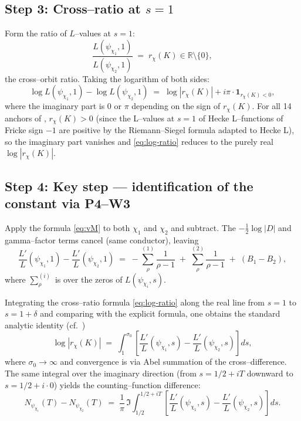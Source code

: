 \documentclass[11pt]{amsart}
\theoremstyle{definition}
\theoremstyle{remark}
\newcommand{\R}{\mathbb{R}}
\begin{document}
\subsection*{Step 3: Cross--ratio at \(s = 1\)}
Form the ratio of \(L\)--values at \(s = 1\):
\begin{equation}\label{eq:ratio-eq}
  \frac{L(\psi_{\chi_1}, 1)}{L(\psi_{\chi_2}, 1)}
  \;=\;
  r_\chi(K) \in \R\setminus\{0\} ,
\end{equation}
the cross--orbit ratio. Taking the logarithm of both sides:
\begin{equation}\label{eq:log-ratio}
  \log L(\psi_{\chi_1}, 1) - \log L(\psi_{\chi_2}, 1)
  \;=\;
  \log|r_\chi(K)| + i\pi \cdot \mathbf{1}_{r_\chi(K) < 0} ,
\end{equation}
where the imaginary part is \(0\) or \(\pi\) depending on the sign of
\(r_\chi(K)\). For all 14 anchors of ,
\(r_\chi(K) > 0\) (since the L--values at \(s = 1\) of Hecke
L--functions of Fricke sign \(-1\) are positive by the
Riemann--Siegel formula adapted to Hecke L), so the imaginary part
vanishes and \eqref{eq:log-ratio} reduces to the purely real
\(\log|r_\chi(K)|\).

\subsection*{Step 4: Key step — identification of the constant via
P4--W3}
Apply the formula \eqref{eq:vM} to both \(\chi_1\) and \(\chi_2\) and
subtract. The \(-\tfrac{1}{2}\log|D|\) and gamma--factor terms cancel
(same conductor), leaving
\begin{equation}\label{eq:cross-vm}
  \frac{L'}{L}(\psi_{\chi_1}, 1) - \frac{L'}{L}(\psi_{\chi_2}, 1)
  \;=\;
  -\sum_\rho^{(1)} \frac{1}{\rho - 1}
  \;+\; \sum_\rho^{(2)} \frac{1}{\rho - 1}
  \;+\; (B_1 - B_2) ,
\end{equation}
where \(\sum_\rho^{(i)}\) is over the zeros of
\(L(\psi_{\chi_i}, s)\).

Integrating the cross--ratio formula \eqref{eq:log-ratio} along the
real line from \(s = 1\) to \(s = 1 + \delta\) and comparing with the
explicit formula, one obtains the standard analytic identity
(cf.\ \cite[§10.5]{IwaniecKowalski2004})
\begin{equation}\label{eq:explicit-cross}
  \log|r_\chi(K)|
  \;=\;
  \int_1^{\sigma_0}
  \!\left[\frac{L'}{L}(\psi_{\chi_1}, s) - \frac{L'}{L}(\psi_{\chi_2}, s)\right] ds ,
\end{equation}
where \(\sigma_0 \to \infty\) and convergence is via Abel summation of
the cross--difference. The same integral over the imaginary direction
(from \(s = 1/2 + iT\) downward to \(s = 1/2 + i\cdot 0\)) yields the
counting--function difference:
\begin{equation}\label{eq:integral-counting}
  N_{\psi_{\chi_1}}(T) - N_{\psi_{\chi_2}}(T)
  \;=\;
  \frac{1}{\pi}\,\Im\!\int_{1/2}^{1/2 + iT}
  \!\!\!\left[\frac{L'}{L}(\psi_{\chi_1}, s) - \frac{L'}{L}(\psi_{\chi_2}, s)\right] ds .
\end{equation}
\end{document}

